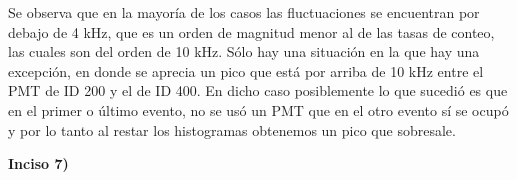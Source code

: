 \documentclass[11pt]{article}
\begin{document}
Se observa que en la mayoría de los casos las fluctuaciones se encuentran por debajo de 4 kHz, que es un orden de magnitud menor al de las tasas de conteo, las cuales son del orden de 10 kHz. Sólo hay una situación en la que hay una excepción, en donde se aprecia un pico que está por arriba de 10 kHz entre el PMT de ID 200 y el de ID 400. En dicho caso posiblemente lo que sucedió es que en el primer o último evento, no se usó un PMT que en el otro evento sí se ocupó y por lo tanto al restar los histogramas obtenemos un pico que sobresale. 

\textbf{Inciso 7)}


\begin{figure}[H]
\centering
{}
\end{figure}
\end{document}
